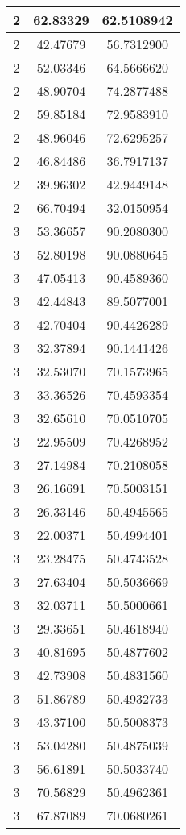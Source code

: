 \documentclass[
]{book}
\begin{document}
\begin{tabular}{c|c|c}
\hline
2 & 62.83329 & 62.5108942\\
\hline
2 & 42.47679 & 56.7312900\\
\hline
2 & 52.03346 & 64.5666620\\
\hline
2 & 48.90704 & 74.2877488\\
\hline
2 & 59.85184 & 72.9583910\\
\hline
2 & 48.96046 & 72.6295257\\
\hline
2 & 46.84486 & 36.7917137\\
\hline
2 & 39.96302 & 42.9449148\\
\hline
2 & 66.70494 & 32.0150954\\
\hline
3 & 53.36657 & 90.2080300\\
\hline
3 & 52.80198 & 90.0880645\\
\hline
3 & 47.05413 & 90.4589360\\
\hline
3 & 42.44843 & 89.5077001\\
\hline
3 & 42.70404 & 90.4426289\\
\hline
3 & 32.37894 & 90.1441426\\
\hline
3 & 32.53070 & 70.1573965\\
\hline
3 & 33.36526 & 70.4593354\\
\hline
3 & 32.65610 & 70.0510705\\
\hline
3 & 22.95509 & 70.4268952\\
\hline
3 & 27.14984 & 70.2108058\\
\hline
3 & 26.16691 & 70.5003151\\
\hline
3 & 26.33146 & 50.4945565\\
\hline
3 & 22.00371 & 50.4994401\\
\hline
3 & 23.28475 & 50.4743528\\
\hline
3 & 27.63404 & 50.5036669\\
\hline
3 & 32.03711 & 50.5000661\\
\hline
3 & 29.33651 & 50.4618940\\
\hline
3 & 40.81695 & 50.4877602\\
\hline
3 & 42.73908 & 50.4831560\\
\hline
3 & 51.86789 & 50.4932733\\
\hline
3 & 43.37100 & 50.5008373\\
\hline
3 & 53.04280 & 50.4875039\\
\hline
3 & 56.61891 & 50.5033740\\
\hline
3 & 70.56829 & 50.4962361\\
\hline
3 & 67.87089 & 70.0680261\\

\end{tabular}
\end{document}
